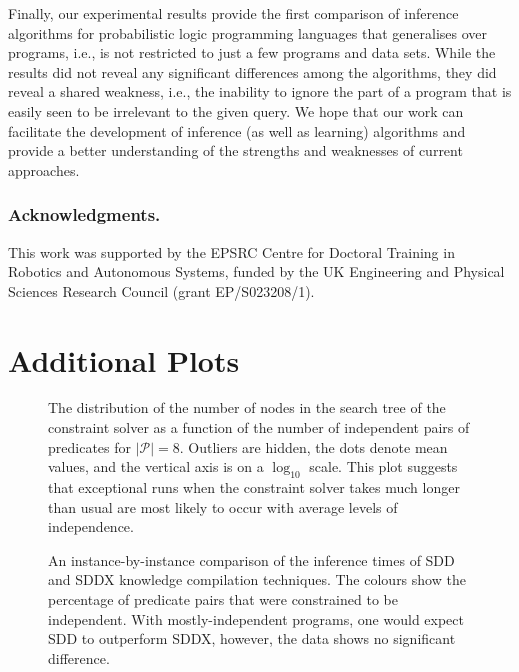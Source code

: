 \documentclass[runningheads]{llncs}
\newcommand{\predicates}{\mathcal{P}}
\begin{document}
Finally, our experimental results provide the first comparison of inference
algorithms for probabilistic logic programming languages that generalises over
programs, i.e., is not restricted to just a few programs and data sets. While
the results did not reveal any significant differences among the algorithms,
they did reveal a shared weakness, i.e., the inability to ignore the part of a
program that is easily seen to be irrelevant to the given query. We hope that
our work can facilitate the development of inference (as well as learning)
algorithms and provide a better understanding of the strengths and weaknesses of
current approaches.

\subsubsection*{Acknowledgments.}
This work was supported by the EPSRC Centre for Doctoral Training in Robotics
and Autonomous Systems, funded by the UK Engineering and Physical Sciences
Research Council (grant EP/S023208/1).




\newpage
\appendix
\section{Additional Plots}

\begin{figure}[h]
 \centering
 
 \caption{The distribution of the number of nodes in the search tree of the
   constraint solver as a function of the number of independent pairs of
   predicates for $|\predicates{}| = 8$. Outliers are hidden, the dots denote
   mean values, and the vertical axis is on a $\log_{10}$ scale. This plot
   suggests that exceptional runs when the constraint solver takes much longer
   than usual are most likely to occur with average levels of independence.}
 \label{fig:phase_transition}
\end{figure}

\begin{figure}[h]
  \centering
  
  \caption{An instance-by-instance comparison of the inference times of SDD and
    SDDX knowledge compilation techniques. The colours show the percentage of
    predicate pairs that were constrained to be independent. With
    mostly-independent programs, one would expect SDD to outperform SDDX,
    however, the data shows no significant difference.}
\end{figure}
\end{document}

